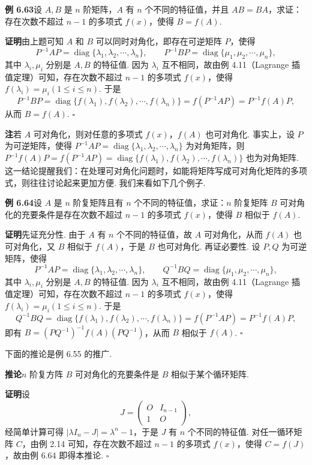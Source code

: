\documentclass[UTF8, 12pt, fontset=fandol, oneside]{ctexart}
\begin{document}
\noindent\textbf{例 6.63}\quad 设 $A,B$ 是 $n$ 阶矩阵，$A$ 有 $n$ 个不同的特征值，并且 $AB=BA$，求证：存在次数不超过 $n-1$ 的多项式 $f(x)$，使得 $B=f(A)$.

\noindent\textbf{证明}\quad 由上题可知 $A$ 和 $B$ 可以同时对角化，即存在可逆矩阵 $P$，使得
\[
P^{-1}AP=\operatorname{diag}\{\lambda_1,\lambda_2,\cdots,\lambda_n\},\qquad
P^{-1}BP=\operatorname{diag}\{\mu_1,\mu_2,\cdots,\mu_n\},
\]
其中 $\lambda_i,\mu_i$ 分别是 $A,B$ 的特征值. 因为 $\lambda_i$ 互不相同，故由例 4.11（Lagrange 插值定理）可知，存在次数不超过 $n-1$ 的多项式 $f(x)$，使得 $f(\lambda_i)=\mu_i(1\le i\le n)$. 于是
\[
P^{-1}BP=\operatorname{diag}\{f(\lambda_1),f(\lambda_2),\cdots,f(\lambda_n)\}
=f(P^{-1}AP)=P^{-1}f(A)P,
\]
从而 $B=f(A)$. $\square$

\noindent\textbf{注}\quad 若 $A$ 可对角化，则对任意的多项式 $f(x)$，$f(A)$ 也可对角化. 事实上，设 $P$ 为可逆矩阵，使得 $P^{-1}AP=\operatorname{diag}\{\lambda_1,\lambda_2,\cdots,\lambda_n\}$ 为对角矩阵，则 $P^{-1}f(A)P=f(P^{-1}AP)=\operatorname{diag}\{f(\lambda_1),f(\lambda_2),\cdots,f(\lambda_n)\}$ 也为对角矩阵. 这一结论提醒我们：在处理可对角化问题时，如能将矩阵写成可对角化矩阵的多项式，则往往讨论起来更加方便. 我们来看如下几个例子.

\noindent\textbf{例 6.64}\quad 设 $A$ 是 $n$ 阶复矩阵且有 $n$ 个不同的特征值，求证：$n$ 阶复矩阵 $B$ 可对角化的充要条件是存在次数不超过 $n-1$ 的多项式 $f(x)$，使得 $B$ 相似于 $f(A)$.

\noindent\textbf{证明}\quad 先证充分性. 由于 $A$ 有 $n$ 个不同的特征值，故 $A$ 可对角化，从而 $f(A)$ 也可对角化，又 $B$ 相似于 $f(A)$，于是 $B$ 也可对角化. 再证必要性. 设 $P,Q$ 为可逆矩阵，使得
\[
P^{-1}AP=\operatorname{diag}\{\lambda_1,\lambda_2,\cdots,\lambda_n\},\qquad
Q^{-1}BQ=\operatorname{diag}\{\mu_1,\mu_2,\cdots,\mu_n\},
\]
其中 $\lambda_i,\mu_i$ 分别是 $A,B$ 的特征值. 因为 $\lambda_i$ 互不相同，故由例 4.11（Lagrange 插值定理）可知，存在次数不超过 $n-1$ 的多项式 $f(x)$，使得 $f(\lambda_i)=\mu_i(1\le i\le n)$. 于是
\[
Q^{-1}BQ=\operatorname{diag}\{f(\lambda_1),f(\lambda_2),\cdots,f(\lambda_n)\}
=f(P^{-1}AP)=P^{-1}f(A)P,
\]
即有 $B=(PQ^{-1})^{-1}f(A)(PQ^{-1})$，从而 $B$ 相似于 $f(A)$. $\square$

下面的推论是例 6.55 的推广.

\noindent\textbf{推论}\quad $n$ 阶复方阵 $B$ 可对角化的充要条件是 $B$ 相似于某个循环矩阵.

\noindent\textbf{证明}\quad 设
\[
J=\left(\begin{array}{cc}
O & I_{n-1}\\
1 & O
\end{array}\right),
\]
经简单计算可得 $|\lambda I_n-J|=\lambda^n-1$，于是 $J$ 有 $n$ 个不同的特征值. 对任一循环矩阵 $C$，由例 2.14 可知，存在次数不超过 $n-1$ 的多项式 $f(x)$，使得 $C=f(J)$，故由例 6.64 即得本推论. $\square$
\end{document}
